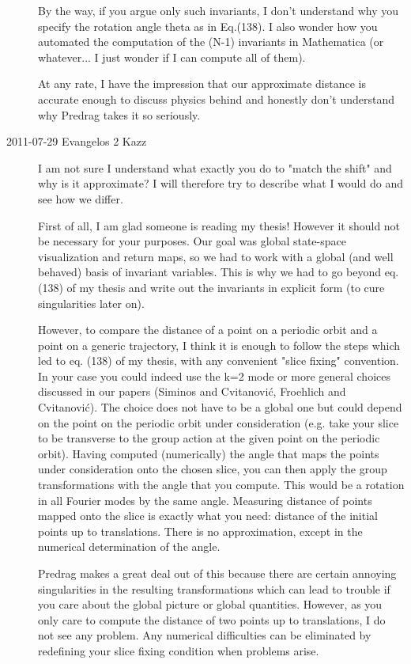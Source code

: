 \begin{description}
By the way, if you argue only such invariants, I don't understand why you
specify the rotation angle theta as in Eq.(138). I also wonder how you
automated the computation of the (N-1) invariants in Mathematica (or
whatever... I just wonder if I can compute all of them).

At any rate, I have the impression that our approximate distance is
accurate enough to discuss physics behind and honestly don't understand
why Predrag takes it so seriously.

\item[2011-07-29 Evangelos 2 Kazz]
I am not sure I understand what exactly you do to "match the shift"
and why is it approximate? I will therefore try to describe what I
would do and see how we differ.

First of all, I am glad someone is reading my thesis! However it
should not be necessary for your purposes. Our goal was global
state-space visualization and return maps, so we had to work with a
global (and well behaved) basis of invariant variables. This is why we
had to go beyond eq. (138) of my thesis and write out the invariants
in explicit form (to cure singularities later on).

However, to compare the distance of a point on a periodic orbit and a
point on a generic trajectory, I think it is enough to follow the steps
which led to eq. (138) of my thesis, with any convenient "slice fixing"
convention. In your case you could indeed use the k=2 mode or more
general choices discussed in our papers (Siminos and
Cvitanovi\'c, Froehlich and Cvitanovi\'c). The
choice does not have to be a global one but could depend on the point
on the periodic orbit under consideration (e.g. take your slice to be
transverse to the group action at the given point on the periodic
orbit). Having computed (numerically) the angle that maps the points
under consideration onto the chosen slice, you can then apply the
group transformations with the angle that you compute. This would be a
rotation in all Fourier modes by the same angle. Measuring distance of
points mapped onto the slice is exactly what you need: distance of the
initial points up to translations. There is no approximation, except
in the numerical determination of the angle.

Predrag makes a great deal out of this because there are certain
annoying singularities in the resulting transformations which can lead
to trouble if you care about the global picture or global quantities.
However, as you only care to compute the distance of two points up to
translations, I do not see any problem. Any numerical difficulties can
be eliminated by redefining your slice fixing condition when problems
arise.


\end{description}
